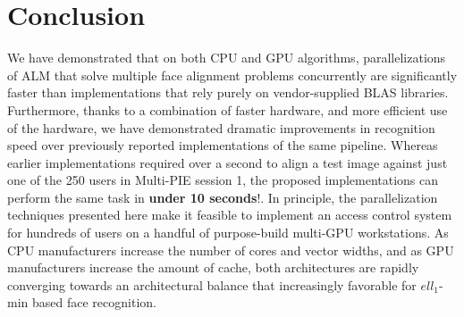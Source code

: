 \documentclass[10pt,twocolumn,letterpaper]{article}
\begin{document}
\section{Conclusion}
We have demonstrated that on both CPU and GPU algorithms, parallelizations of
ALM that solve multiple face alignment problems concurrently are significantly
faster than implementations that rely purely on vendor-supplied BLAS libraries.
Furthermore, thanks to a combination of faster hardware, and more efficient use
of the hardware, we have demonstrated dramatic improvements in recognition
speed over previously reported implementations of the same pipeline.  Whereas
earlier implementations required over a second to align a test image against
just one of the 250 users in Multi-PIE session 1, the proposed 
implementations can perform the same task in 
{\bf under 10 seconds}!.  In principle, the
parallelization techniques presented here make it feasible to implement an
access control system for hundreds of users on a handful of purpose-build
multi-GPU workstations.  As CPU manufacturers 
increase the number of cores and vector widths, and as GPU manufacturers increase the amount
of cache, both architectures are rapidly converging towards an architectural balance
that increasingly favorable for $ell_1$-min based face recognition.


{\small


}
\end{document}

